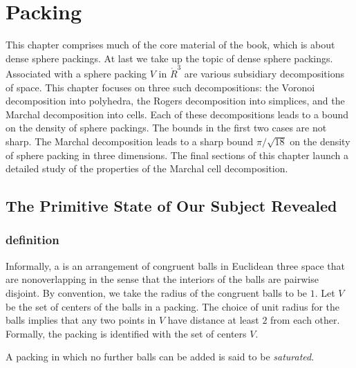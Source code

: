 
\chapter{Packing}

\begin{summary}
  This chapter comprises much of the core material of the book, which
  is about dense sphere packings.  At last we take up the topic of
  dense sphere packings.  Associated with a sphere packing $V$ in
  $\ring{R}^3$ are various subsidiary decompositions of space.  This
  chapter focuses on three such decompositions: the Voronoi
  decomposition into polyhedra, the Rogers decomposition into
  simplices, and the Marchal decomposition into cells.  Each of these
  decompositions leads to a bound on the density of sphere packings.
  The bounds in the first two cases are not sharp.  The Marchal
  decomposition leads to a sharp bound $\pi/\sqrt{18}$ on the density
  of sphere packing in three dimensions.  The final sections of this
  chapter launch a detailed study of the properties of the Marchal
  cell decomposition.
\end{summary}

\section{The Primitive State of Our Subject Revealed}


\subsection{definition}



Informally, a  is an arrangement of congruent
balls in Euclidean three space that are nonoverlapping in the sense
that the interiors of the balls are pairwise disjoint.  By convention,
we take the radius of the congruent balls to be $1$.
Let $ V$ be the set of centers of the balls in a
packing. The choice of unit radius for the
balls implies that any two points in $ V$ have distance  at
least $2$ from each other. 
 Formally, the packing is identified
with the set of centers $V$.
%

%
A packing in which no further balls can be added is said to be {\it
saturated}.

